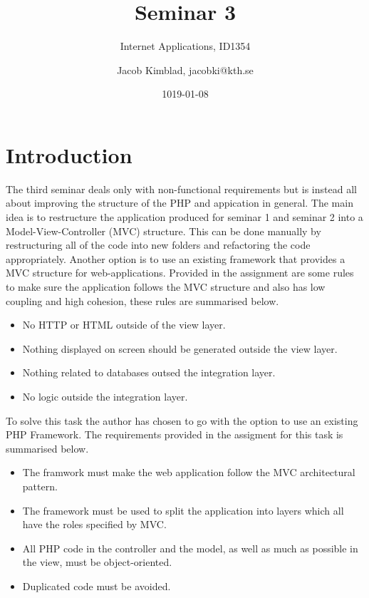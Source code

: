 \documentclass[a4paper]{scrartcl}
\title{Seminar 3}
\subtitle{Internet Applications, ID1354}
\author{Jacob Kimblad, jacobki@kth.se}
\date{1019-01-08}
\begin{document}
\maketitle

\section{Introduction}

The third seminar deals only with non-functional requirements but is instead all about improving the structure of the PHP and appication in general. The main idea is to restructure the application produced for seminar 1 and seminar 2 into a Model-View-Controller (MVC) structure. This can be done manually by restructuring all of the code into new folders and refactoring the code appropriately. 
Another option is to use an existing framework that provides a MVC structure for web-applications. Provided in the assignment are some rules to make sure the application follows the MVC structure and also has low coupling and high cohesion, these rules are summarised below.

\begin{itemize}
    \item No HTTP or HTML outside of the view layer.
    \item Nothing displayed on screen should be generated outside the view layer. 
    \item Nothing related to databases outsed the integration layer.
    \item No logic outside the integration layer.
\end{itemize}

To solve this task the author has chosen to go with the option to use an existing PHP Framework. The requirements provided in the assigment for this task is summarised below.

\begin{itemize}
    \item The framwork must make the web application follow the MVC architectural pattern.
    \item The framework must be used to split the application into layers which all have the roles specified by MVC.
    \item All PHP code in the controller and the model, as well as much as possible in the view, must be object-oriented.
    \item Duplicated code must be avoided.
\end{itemize}
\end{document}
